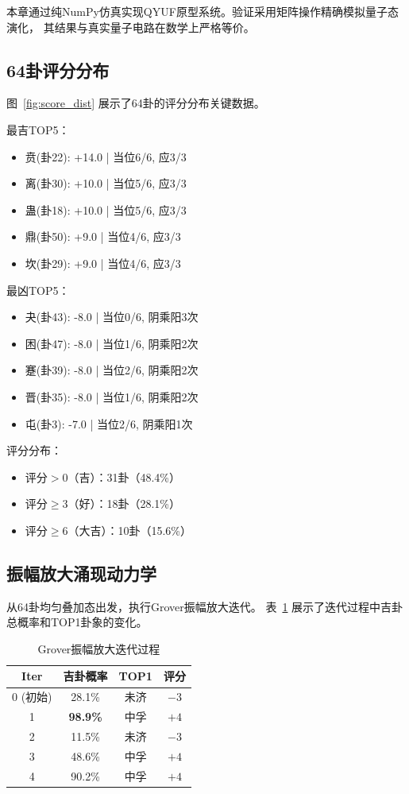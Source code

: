 \documentclass[twocolumn]{article}
\begin{document}
本章通过纯NumPy仿真实现QYUF原型系统。验证采用矩阵操作精确模拟量子态演化，
其结果与真实量子电路在数学上严格等价\cite{qyufcode2026}。

\subsection{64卦评分分布}

图~\ref{fig:score_dist} 展示了64卦的评分分布关键数据。

最吉TOP5：
\begin{itemize}
  \item 贲(卦22): +14.0 | 当位6/6, 应3/3
  \item 离(卦30): +10.0 | 当位5/6, 应3/3
  \item 蛊(卦18): +10.0 | 当位5/6, 应3/3
  \item 鼎(卦50): +9.0  | 当位4/6, 应3/3
  \item 坎(卦29): +9.0  | 当位4/6, 应3/3
\end{itemize}

最凶TOP5：
\begin{itemize}
  \item 夬(卦43): -8.0 | 当位0/6, 阴乘阳3次
  \item 困(卦47): -8.0 | 当位1/6, 阴乘阳2次
  \item 蹇(卦39): -8.0 | 当位2/6, 阴乘阳2次
  \item 晋(卦35): -8.0 | 当位1/6, 阴乘阳2次
  \item 屯(卦3):  -7.0 | 当位2/6, 阴乘阳1次
\end{itemize}

评分分布：
\begin{itemize}
  \item 评分$>0$（吉）：31卦（48.4\%）
  \item 评分$\geq 3$（好）：18卦（28.1\%）
  \item 评分$\geq 6$（大吉）：10卦（15.6\%）
\end{itemize}

\subsection{振幅放大涌现动力学}

从64卦均匀叠加态出发，执行Grover振幅放大迭代。
表~\ref{tab:grover} 展示了迭代过程中吉卦总概率和TOP1卦象的变化。

\begin{table}[htbp]
\centering
\caption{Grover振幅放大迭代过程}
\label{tab:grover}
\begin{tabular}{cccc}
\toprule
\textbf{Iter} & \textbf{吉卦概率} & \textbf{TOP1} & \textbf{评分} \\
\midrule
0 (初始) & 28.1\% & 未济 & $-3$ \\
1 & \textbf{98.9\%} & 中孚 & $+4$ \\
2 & 11.5\% & 未济 & $-3$ \\
3 & 48.6\% & 中孚 & $+4$ \\
4 & 90.2\% & 中孚 & $+4$ \\
\bottomrule
\end{tabular}
\end{table}
\end{document}
